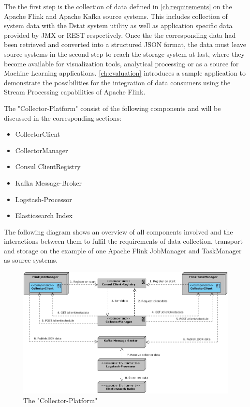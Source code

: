 The the first step is the collection of data defined in \autoref{ch:requirements} on the Apache Flink and Apache Kafka source
systems. This includes collection of system data with the Dstat system utility as well as application specific data provided
by JMX or REST respectively. Once the the corresponding data had been retrieved and converted into a structured JSON format,
the data must leave source systems in the second step to reach the storage system at last, where they become available for
visualization tools, analytical processing or as a source for Machine Learning applications. \autoref{ch:evaluation} introduces
a sample application to demonstrate the possibilities for the integration of data consumers using the Stream Processing capabilities
of Apache Flink.

The "Collector-Platform" consist of the following components and will be discussed in the corresponding sections:

\begin{itemize}
    \item CollectorClient
    \item CollectorManager
    \item Consul ClientRegistry
    \item Kafka Message-Broker
    \item Logstash-Processor
    \item Elasticsearch Index
\end{itemize}

The following diagram shows an overview of all components involved and the interactions between them to fulfil the
requirements of data collection, transport and storage on the example of one Apache Flink JobManager and TaskManager as
source systems.

\begin{figure}[H]
	\centering
	\includegraphics[width=1.0\textwidth]{../uml/component-diagram.jpg}
	\caption{The "Collector-Platform"}
	\label{fig:collector-platform}
\end{figure}

